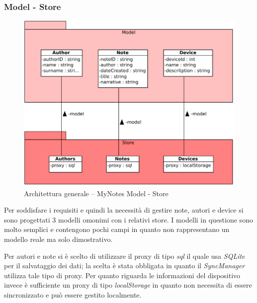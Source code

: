 \subsubsection{Model - Store}
\begin{figure}[htb]
\centering
\includegraphics[scale=0.6]{gfx/class/MyNotes_Model_Store.pdf}
\caption{Architettura generale -- MyNotes Model - Store}
\label{fig:architettura MyNotes Model-Store}
\end{figure}
Per soddisfare i requisiti e quindi la necessità di gestire note, autori e device si sono progettati 3 modelli omonimi con i relativi store.
I modelli in questione sono molto semplici e contengono pochi campi in quanto non rappresentano un modello reale ma solo dimostrativo.

Per autori e note si è scelto di utilizzare il proxy di tipo \emph{sql} il quale usa \emph{SQLite} per il salvataggio dei dati; la scelta è stata obbligata in quanto il \emph{SyncManager} utilizza tale tipo di proxy.
Per quanto riguarda le informazioni del dispositivo invece è sufficiente un proxy di tipo \emph{localStorage} in quanto non necessita di essere sincronizzato e può essere gestito localmente.

